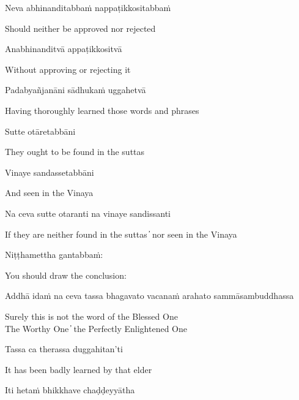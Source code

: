 Neva abhinanditabbaṁ nappaṭikkositabbaṁ

\begin{cprenglish}
Should neither be approved nor rejected
\end{cprenglish}

Anabhinanditvā appaṭikkositvā

\begin{cprenglish}
Without approving or rejecting it
\end{cprenglish}

Padabyañjanāni sādhukaṁ uggahetvā

\begin{cprenglish}
Having thoroughly learned those words and phrases
\end{cprenglish}

Sutte otāretabbāni

\begin{cprenglish}
They ought to be found in the suttas
\end{cprenglish}

Vinaye sandassetabbāni

\begin{cprenglish}
And seen in the Vinaya
\end{cprenglish}

Na ceva sutte otaranti na vinaye sandissanti

\begin{cprenglish}
If they are neither found in the suttas  ̓  nor seen in the Vinaya
\end{cprenglish}

Niṭṭhamettha gantabbaṁ:

\begin{cprenglish}
You should draw the conclusion:
\end{cprenglish}

Addhā idaṁ na ceva tassa bhagavato vacanaṁ arahato sammāsambuddhassa

\begin{cprenglish}
Surely this is not the word of the Blessed One\\
The Worthy One  ̓  the Perfectly Enlightened One
\end{cprenglish}

Tassa ca therassa duggahitan’ti

\begin{cprenglish}
It has been badly learned by that elder
\end{cprenglish}

Iti hetaṁ bhikkhave chaḍḍeyyātha


